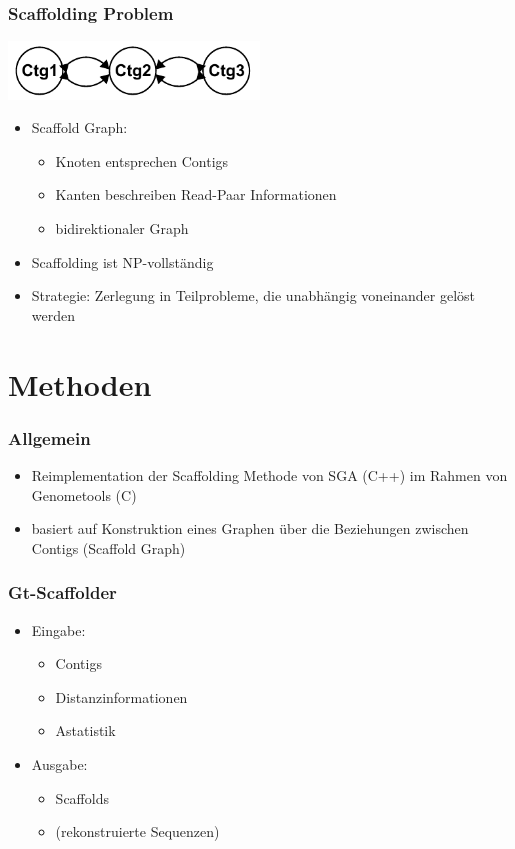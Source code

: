 \documentclass[xcolor=pst]{beamer}
\begin{document}
\begin{frame}
  \frametitle{Scaffolding Problem}
  \begin{center}
    \includegraphics[width=0.5\textwidth,height=0.8\textheight,keepaspectratio]{figures/Scaffolding_3.pdf}
  \end{center}
  \begin{itemize}
  \item Scaffold Graph:
    \begin{itemize}
    \item Knoten entsprechen Contigs
    \item Kanten beschreiben Read-Paar
      Informationen
    \item bidirektionaler Graph
    \end{itemize}
  \item Scaffolding ist NP-vollständig
  \item Strategie: Zerlegung in
    Teilprobleme, die unabhängig voneinander gelöst werden
  \end{itemize}
\end{frame}

\section{Methoden}
\begin{frame}
  \frametitle{Allgemein}
  \begin{itemize}
  \item Reimplementation der Scaffolding Methode von SGA (C++) im
    Rahmen von Genometools (C)
  \item basiert auf Konstruktion eines Graphen über die Beziehungen
    zwischen Contigs (Scaffold Graph)
  \end{itemize}
\end{frame}

\begin{frame}
  \frametitle{Gt-Scaffolder}
  \begin{itemize}
  \item Eingabe:
    \begin{itemize}
    \item Contigs
    \item Distanzinformationen
    \item Astatistik %
    \end{itemize}
  \item Ausgabe:
    \begin{itemize}
    \item Scaffolds
    \item (rekonstruierte Sequenzen)
    \end{itemize}
  \end{itemize}
\end{frame}
\end{document}
